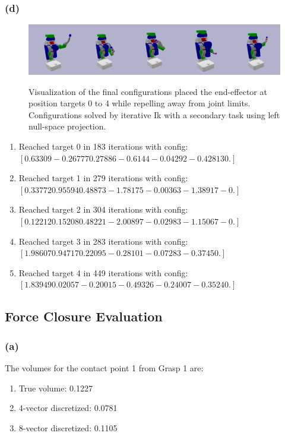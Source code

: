 \documentclass{article}
\theoremstyle{definition} %
\begin{document}
\subsubsection*{(d)}
\begin{figure}[H]
    \centering
        \textsf{\includegraphics[width=0.9\columnwidth]{ik_null_target_group.png}}
        \caption{Visualization of the final configurations placed the end-effector at position targets 0 to 4 while repelling away from joint limits. Configurations solved by iterative Ik with a secondary task using left null-space projection.}
        \label{fig:ik_null}
\end{figure}

\begin{enumerate}
    \item Reached target 0 in 183 iterations with config:\\
    $[ 0.63309 -0.26777  0.27886 -0.6144  -0.04292 -0.42813  0.     ]$
    \item Reached target 1 in 279 iterations with config:\\
    $[ 0.33772  0.95594  0.48873 -1.78175 -0.00363 -1.38917 -0.     ]$
    \item Reached target 2 in 304 iterations with config:\\
    $[ 0.12212  0.15208  0.48221 -2.00897 -0.02983 -1.15067 -0.     ]$
    \item Reached target 3 in 283 iterations with config:\\
    $[ 1.98607  0.94717  0.22095 -0.28101 -0.07283 -0.3745   0.     ]$
    \item Reached target 4 in 449 iterations with config:\\
    $[ 1.83949  0.02057 -0.20015 -0.49326 -0.24007 -0.3524   0.     ]$
\end{enumerate}


\subsection*{Force Closure Evaluation}
\subsubsection*{(a)}
The volumes for the contact point 1 from Grasp 1 are:
\begin{enumerate}
	\item True volume: 0.1227
	\item 4-vector discretized: 0.0781
	\item 8-vector discretized: 0.1105
\end{enumerate}
\end{document}
